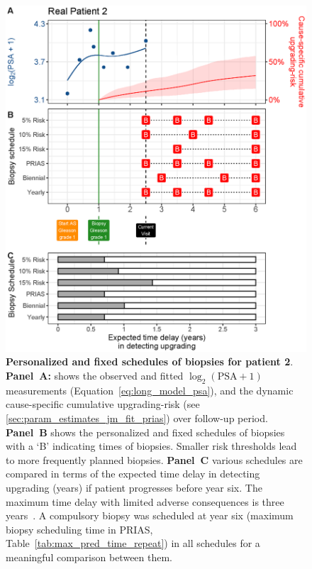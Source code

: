 \begin{figure}
\centerline{\includegraphics[width=\columnwidth]{images/demo_pat2_supp.eps}}
\caption{\textbf{Personalized and fixed schedules of biopsies for patient 2}. \textbf{Panel~A:} shows the observed and fitted $\log_2(\mbox{PSA} + 1)$ measurements (Equation~\ref{eq:long_model_psa}), and the dynamic cause-specific cumulative upgrading-risk (see \ref{sec:param_estimates_jm_fit_prias}) over follow-up period. \textbf{Panel~B} shows the personalized and fixed schedules of biopsies with a `B' indicating times of biopsies. Smaller risk thresholds lead to more frequently planned biopsies. \textbf{Panel~C} various schedules are compared in terms of the expected time delay in detecting upgrading (years) if patient progresses before year six. The maximum time delay with limited adverse consequences is three years~\citep{de2017estimating}. A compulsory biopsy was scheduled at year six (maximum biopsy scheduling time in PRIAS, Table~\ref{tab:max_pred_time_repeat}) in all schedules for a meaningful comparison between them.}
\label{fig:demo_pat2_supp}
\end{figure}

